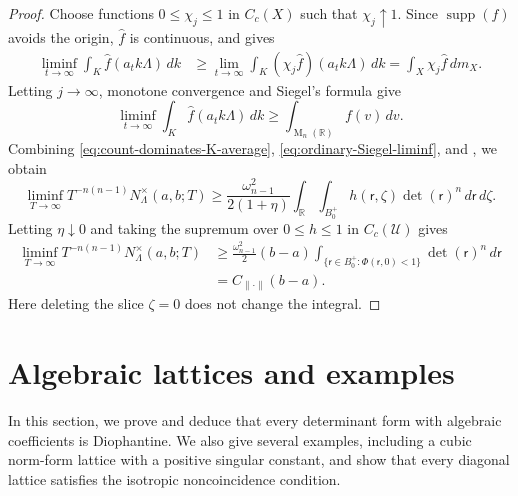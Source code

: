 \documentclass[reqno,11pt]{amsart}
\numberwithin{equation}{section}
\theoremstyle{definition}
\theoremstyle{remark}
\newcommand{\op}{\operatorname}
\newcommand{\M}{\op{M}}
\begin{document}
\begin{proof}
Choose functions $0\le\chi_j\le1$ in $C_c(X)$ such that
$\chi_j\uparrow1$. Since $\operatorname{supp}(f)$ avoids the origin,
$\widehat f$ is continuous, and
 gives
$$
\begin{aligned}
\liminf_{t\to\infty}\int_K\widehat f(a_tk\Lambda)\,dk
&\ge
\lim_{t\to\infty}
\int_K(\chi_j\widehat f)(a_tk\Lambda)\,dk =
\int_X\chi_j\widehat f\,dm_X.
\end{aligned}
$$
Letting $j\to\infty$, monotone convergence and Siegel's formula give
\begin{equation}\label{eq:ordinary-Siegel-liminf}
\liminf_{t\to\infty}
\int_K\widehat f(a_tk\Lambda)\,dk
\ge
\int_{\M_n(\mathbb R)}f(v)\,dv.
\end{equation}
Combining \eqref{eq:count-dominates-K-average},
\eqref{eq:ordinary-Siegel-liminf}, and , we obtain
$$
\liminf_{T\to\infty}T^{-n(n-1)}N_\Lambda^\times(a,b;T)
\ge
\frac{\omega_{n-1}^2}{2(1+\eta)}
\int_{\mathbb R}\int_{B_0^+}
h(\mathsf r,\zeta)\det(\mathsf r)^n\,d\mathsf r\,d\zeta.
$$
Letting $\eta\downarrow0$ and taking the supremum over
$0\le h\le1$ in $C_c(\mathcal U)$ gives
$$
\begin{aligned}
\liminf_{T\to\infty}T^{-n(n-1)}N_\Lambda^\times(a,b;T)
&\ge
\frac{\omega_{n-1}^2}{2}(b-a)
\int_{\{\mathsf r\in B_0^+:\Phi(\mathsf r,0)<1\}}
\det(\mathsf r)^n\,d\mathsf r\\
&=
C_{\|\cdot\|}(b-a).
\end{aligned}
$$
Here deleting the slice $\zeta=0$ does not change the integral.
\end{proof}



\section{Algebraic lattices and examples}\label{s:example}
In this section, we prove
 and deduce that every determinant
form with algebraic coefficients is Diophantine. We also give several
examples, including a cubic norm-form lattice with a positive singular
constant, and show that every diagonal lattice satisfies the isotropic
noncoincidence condition.
\end{document}
